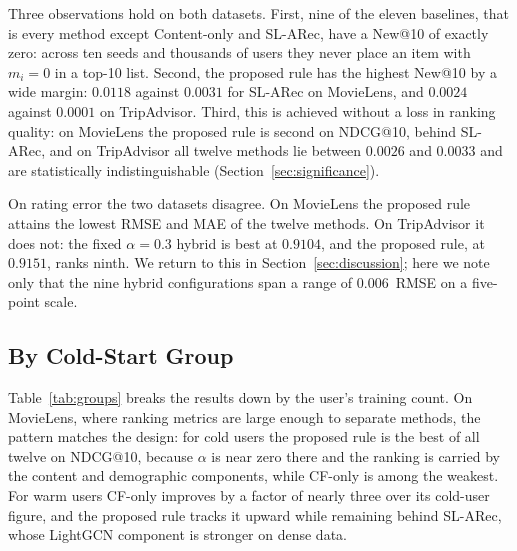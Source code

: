\documentclass[runningheads]{llncs}
\begin{document}
Three observations hold on both datasets. First, nine of the eleven baselines, that is every method except Content-only and SL-ARec, have a New@10 of exactly zero: across ten seeds and thousands of users they never place an item with $m_i = 0$ in a top-10 list. Second, the proposed rule has the highest New@10 by a wide margin: $0.0118$ against $0.0031$ for SL-ARec on MovieLens, and $0.0024$ against $0.0001$ on TripAdvisor. Third, this is achieved without a loss in ranking quality: on MovieLens the proposed rule is second on NDCG@10, behind SL-ARec, and on TripAdvisor all twelve methods lie between $0.0026$ and $0.0033$ and are statistically indistinguishable (Section~\ref{sec:significance}).

On rating error the two datasets disagree. On MovieLens the proposed rule attains the lowest RMSE and MAE of the twelve methods. On TripAdvisor it does not: the fixed $\alpha = 0.3$ hybrid is best at $0.9104$, and the proposed rule, at $0.9151$, ranks ninth. We return to this in Section~\ref{sec:discussion}; here we note only that the nine hybrid configurations span a range of $0.006$~RMSE on a five-point scale.

\subsection{By Cold-Start Group}

Table~\ref{tab:groups} breaks the results down by the user's training count. On MovieLens, where ranking metrics are large enough to separate methods, the pattern matches the design: for cold users the proposed rule is the best of all twelve on NDCG@10, because $\alpha$ is near zero there and the ranking is carried by the content and demographic components, while CF-only is among the weakest. For warm users CF-only improves by a factor of nearly three over its cold-user figure, and the proposed rule tracks it upward while remaining behind SL-ARec, whose LightGCN component is stronger on dense data.
\end{document}
